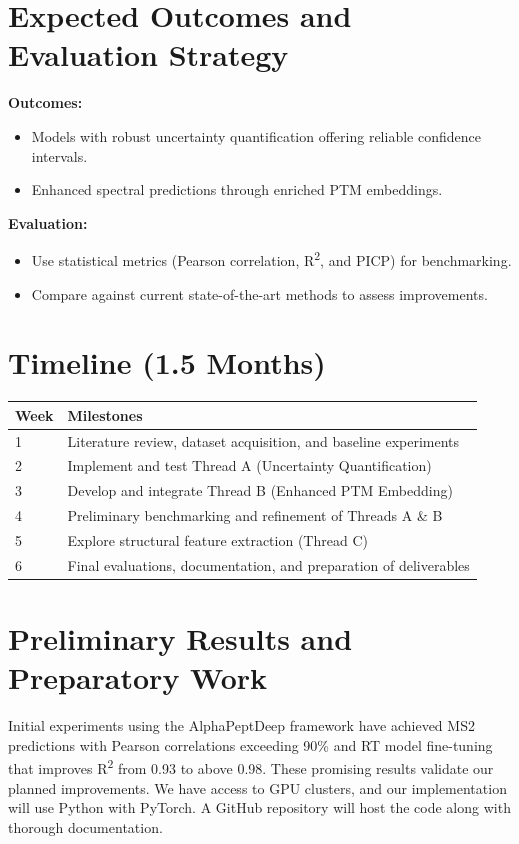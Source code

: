 \documentclass[10pt]{article}
\begin{document}
\section*{Expected Outcomes and Evaluation Strategy}
\textbf{Outcomes:}
\begin{itemize}[noitemsep]
    \item Models with robust uncertainty quantification offering reliable confidence intervals.
    \item Enhanced spectral predictions through enriched PTM embeddings.

\end{itemize}
\textbf{Evaluation:}
\begin{itemize}[noitemsep]
    \item Use statistical metrics (Pearson correlation, R\textsuperscript{2}, and PICP) for benchmarking.
    \item Compare against current state-of-the-art methods to assess improvements.
\end{itemize}


\section*{Timeline (1.5 Months)}
\begin{tabular}{@{}ll@{}}
\toprule
\textbf{Week} & \textbf{Milestones} \\ \midrule
1 & Literature review, dataset acquisition, and baseline experiments \\
2 & Implement and test Thread A (Uncertainty Quantification) \\
3 & Develop and integrate Thread B (Enhanced PTM Embedding) \\
4 & Preliminary benchmarking and refinement of Threads A \& B \\
5 & Explore structural feature extraction (Thread C) \\
6 & Final evaluations, documentation, and preparation of deliverables \\ \bottomrule
\end{tabular}

\section*{Preliminary Results and Preparatory Work}
Initial experiments using the AlphaPeptDeep framework \cite{AlphaPeptDeep} have achieved MS2 predictions with Pearson correlations exceeding 90\% and RT model fine-tuning that improves R\textsuperscript{2} from 0.93 to above 0.98. These promising results validate our planned improvements. We have access to GPU clusters, and our implementation will use Python with PyTorch. A GitHub repository will host the code along with thorough documentation.
\end{document}
